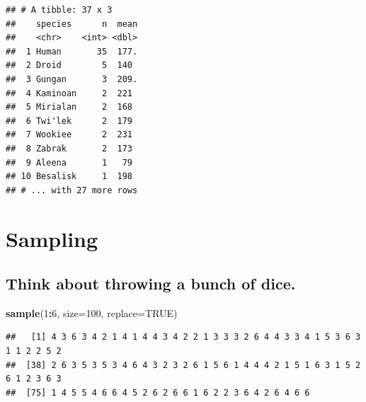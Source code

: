\documentclass[]{book}
\newenvironment{Shaded}{\begin{snugshade}}{\end{snugshade}}
\newcommand{\DataTypeTok}[1]{\textcolor[rgb]{0.13,0.29,0.53}{#1}}
\newcommand{\DecValTok}[1]{\textcolor[rgb]{0.00,0.00,0.81}{#1}}
\newcommand{\KeywordTok}[1]{\textcolor[rgb]{0.13,0.29,0.53}{\textbf{#1}}}
\newcommand{\NormalTok}[1]{#1}
\newcommand{\OperatorTok}[1]{\textcolor[rgb]{0.81,0.36,0.00}{\textbf{#1}}}
\newcommand{\OtherTok}[1]{\textcolor[rgb]{0.56,0.35,0.01}{#1}}
\newcommand{\StringTok}[1]{\textcolor[rgb]{0.31,0.60,0.02}{#1}}
\begin{document}
\begin{Shaded}
\end{Shaded}

\begin{verbatim}
## # A tibble: 37 x 3
##    species      n  mean
##    <chr>    <int> <dbl>
##  1 Human       35  177.
##  2 Droid        5  140 
##  3 Gungan       3  209.
##  4 Kaminoan     2  221 
##  5 Mirialan     2  168 
##  6 Twi'lek      2  179 
##  7 Wookiee      2  231 
##  8 Zabrak       2  173 
##  9 Aleena       1   79 
## 10 Besalisk     1  198 
## # ... with 27 more rows
\end{verbatim}

\hypertarget{sampling}{%
\chapter{Sampling}\label{sampling}}

\hypertarget{think-about-throwing-a-bunch-of-dice.}{%
\section{Think about throwing a bunch of dice.}\label{think-about-throwing-a-bunch-of-dice.}}

\begin{Shaded}
\begin{Highlighting}[]
\KeywordTok{sample}\NormalTok{(}\DecValTok{1}\OperatorTok{:}\DecValTok{6}\NormalTok{, }\DataTypeTok{size=}\DecValTok{100}\NormalTok{, }\DataTypeTok{replace=}\OtherTok{TRUE}\NormalTok{) }
\end{Highlighting}
\end{Shaded}

\begin{verbatim}
##   [1] 4 3 6 3 4 2 1 4 1 4 4 3 4 2 2 1 3 3 3 2 6 4 4 3 3 4 1 5 3 6 3 1 1 2 2 5 2
##  [38] 2 6 3 5 3 5 3 4 6 4 3 2 3 2 6 1 5 6 1 4 4 4 2 1 5 1 6 3 1 5 2 6 1 2 3 6 3
##  [75] 1 4 5 5 4 6 6 4 5 2 6 2 6 6 1 6 2 2 3 6 4 2 6 4 6 6
\end{verbatim}
\end{document}
